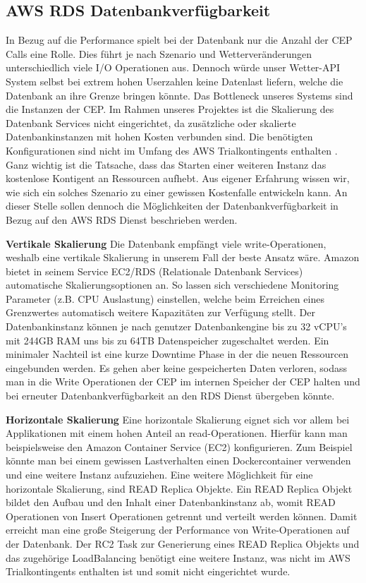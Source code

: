 \subsection{AWS RDS Datenbankverfügbarkeit}
In Bezug auf die Performance spielt bei der Datenbank nur die Anzahl der CEP Calls eine Rolle. Dies führt je nach Szenario und Wetterveränderungen unterschiedlich viele I/O Operationen aus. Dennoch würde unser Wetter-API System selbst bei extrem hohen Userzahlen keine Datenlast liefern, welche die Datenbank an ihre Grenze bringen könnte. Das Bottleneck unseres Systems sind die Instanzen der CEP. Im Rahmen unseres Projektes ist die Skalierung des Datenbank Services nicht eingerichtet, da zusätzliche oder skalierte Datenbankinstanzen mit hohen Kosten verbunden sind. Die benötigten Konfigurationen sind nicht im Umfang des AWS Trialkontingents enthalten . Ganz wichtig ist die Tatsache, dass das Starten einer weiteren Instanz das kostenlose Kontigent an Ressourcen aufhebt. Aus eigener Erfahrung wissen wir, wie sich ein solches Szenario zu einer gewissen Kostenfalle entwickeln kann.
An dieser Stelle sollen dennoch die Möglichkeiten der Datenbankverfügbarkeit in Bezug auf den AWS RDS Dienst beschrieben werden.

\textbf{Vertikale Skalierung}
Die Datenbank empfängt viele write-Operationen, weshalb eine vertikale Skalierung in unserem Fall der beste Ansatz wäre. Amazon bietet in seinem Service EC2/RDS (Relationale Datenbank Services) automatische Skalierungsoptionen an. So lassen sich verschiedene Monitoring Parameter (z.B. CPU Auslastung) einstellen, welche beim Erreichen eines Grenzwertes automatisch weitere Kapazitäten zur Verfügung stellt. Der Datenbankinstanz können je nach genutzer Datenbankengine bis zu 32 vCPU's mit 244GB RAM uns bis zu 64TB Datenspeicher zugeschaltet werden. Ein minimaler Nachteil ist eine kurze Downtime Phase in der die neuen Ressourcen eingebunden werden. Es gehen aber keine gespeicherten Daten verloren, sodass man in die Write Operationen der CEP im internen Speicher der CEP halten und bei erneuter Datenbankverfügbarkeit an den RDS Dienst übergeben könnte.

\textbf{Horizontale Skalierung}
Eine horizontale Skalierung eignet sich vor allem bei Applikationen mit einem hohen Anteil an read-Operationen. Hierfür kann man beispielsweise den Amazon Container Service (EC2) konfigurieren. Zum Beispiel könnte man bei einem gewissen Lastverhalten einen Dockercontainer verwenden und eine weitere Instanz aufzuziehen.
Eine weitere Möglichkeit für eine horizontale Skalierung, sind READ Replica Objekte. Ein READ Replica Objekt bildet den Aufbau und den Inhalt einer Datenbankinstanz ab, womit READ Operationen von Insert Operationen getrennt und verteilt werden können. Damit erreicht man eine große Steigerung der Performance von Write-Operationen auf der Datenbank. Der RC2 Task zur Generierung eines READ Replica Objekts und das zugehörige LoadBalancing benötigt eine weitere Instanz, was nicht im AWS Trialkontingents enthalten ist und somit nicht eingerichtet wurde.

